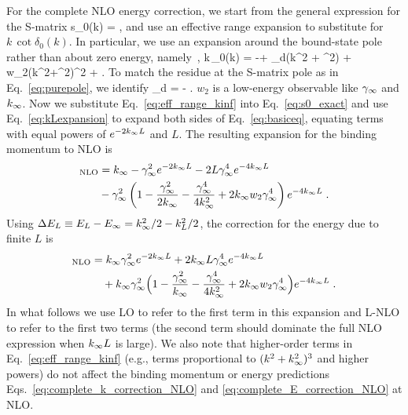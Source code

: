 	For the complete NLO energy correction, we start from the
	general expression for the S-matrix
	\beq
	  s_0(k) = 
	  \;,
	  \label{eq:s0_exact}
	\eeq
	and use an effective range expansion to substitute for $k\,\cot
	\delta_0(k)$.  In particular, we use an expansion
	around the bound-state pole rather than about zero energy,
	namely~\cite{wu2011scattering,Phillips:1999hh},
	 \beq
	  k\,\cot\delta_0(k) = -\kinf +  \rho_d(k^2 + \kinf^2)
	     + w_2(k^2+\kinf^2)^2 +  \cdots
	     \;.
	     \label{eq:eff_range_kinf}
	\eeq
	To match the residue at the S-matrix pole as in Eq.~\eqref{eq:purepole},
	we identify
	\beq
	 \rho_d =  - 
	  \;.
	  \label{eq:rhoD_gamma_rel}
	\eeq
	$w_2$ is a low-energy observable like $\gamma_\infty$ and $k_{\infty}$.
	Now we substitute Eq.~\eqref{eq:eff_range_kinf} into Eq.~\eqref{eq:s0_exact}
	and use Eq.~\eqref{eq:kLexpansion} to expand both sides of
	Eq.~\eqref{eq:basiceq}, equating terms with equal powers of
	$e^{-2k_{\infty} L}$ and $L$.  The resulting expansion for the binding
	momentum to NLO is
	\begin{align}
    [k_L]_{\rm NLO} &=  \kinf - \ANC^2 e^{-2\kinf L}  - 2  L \ANC^4
		e^{-4\kinf L}
    \nonumber  \\
    &\null - \ANC^2 \left(1 - \frac{\ANC^2}{2\kinf} - \frac{\ANC^4}{4\kinf^2}
		+ 2 \kinf w_2 \ANC^4 \right) e^{-4\kinf L} \;.
    \label{eq:complete_k_correction_NLO}
  \end{align}
	Using $\Delta E_L \equiv E_L - E_{\infty} = k_{\infty}^2/2 - k_L^2/2$,
	the correction for the energy due to finite $L$ is
	\begin{align}
  	[\Delta E_L]_{\rm NLO} &=  \kinf \ANC^2 e^{-2\kinf L}
  	+ 2\kinf L\ANC^4 e^{-4\kinf L}
    \nonumber \\
  	& \null\quad +
    \kinf\ANC^2 \Bigl( 1-\frac{\ANC^2}{\kinf}-\frac{\ANC^4}{4\kinf^2}
    + 2\kinf w_2 \ANC^4  \Bigr)  e^{-4\kinf L} \;.
    \label{eq:complete_E_correction_NLO}
	\end{align}
	In what follows we use LO to refer to the first term in this expansion and
	L-NLO to
	refer to the first two terms (the second term should dominate the full
	NLO expression when $k_{\infty} L$ is large).  We also note that
	higher-order terms in Eq.~\eqref{eq:eff_range_kinf} (e.g., terms
	proportional to $(k^2+k_{\infty}^2)^3$ and higher powers) do not affect the
	binding momentum or energy predictions
	Eqs.~\eqref{eq:complete_k_correction_NLO} and
	\eqref{eq:complete_E_correction_NLO} at NLO.

